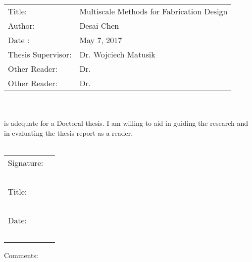 \documentclass[11pt]{article}
\begin{document}
\begin{tabular}{p{4cm} l}
	Title: & Multiscale Methods for Fabrication Design\\
	Author: & Desai Chen\\
	Date : & May 7, 2017 \\
	Thesis Supervisor: & Dr. Wojciech Matusik\\
	Other Reader: & Dr.\\
	Other Reader: & Dr.
\end{tabular}\\~\\
is adequate for a Doctoral thesis. I am willing to aid in guiding the research and in
evaluating the thesis report as a reader.\\~\\
\begin{flushright}
	\begin{tabular}{l l}
		Signature: & \underline{\hspace{6cm}}\\~\\
		Title: & \underline{\hspace{6cm}}\\~\\
		Date: & \underline{\hspace{6cm}}\\~\\
	\end{tabular}
\end{flushright}
Comments:
\newpage
{}







\end{document}
